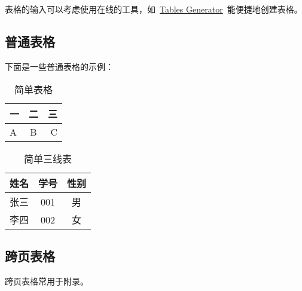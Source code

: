 表格的输入可以考虑使用在线的工具，如~\href{https://www.tablesgenerator.com/}{Tables Generator}~能便捷地创建表格。

\subsection{普通表格}
下面是一些普通表格的示例：

\begin{table}[ht]
  \centering
  \caption{简单表格}
  \label{tab:1}
  \begin{tabular}{|l|c|r|}
    \hline
    一& 二 & 三\\
    \hline
    A& B& C\\
    \hline
  \end{tabular}
\end{table}

\begin{table}[ht]
  \centering
  \caption{简单三线表}
  \label{tab:2}
  \begin{tabular}{ccc}
    \hline
    姓名& 学号& 性别\\
    \hline
    张三& 001& 男\\
    李四& 002& 女\\
    \hline
  \end{tabular}
\end{table}

\subsection{跨页表格}

跨页表格常用于附录。

